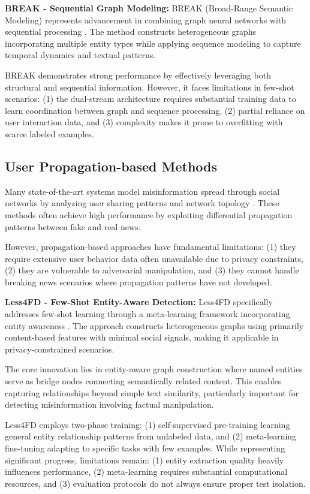 \textbf{BREAK - Sequential Graph Modeling:} BREAK (Broad-Range Semantic Modeling) represents advancement in combining graph neural networks with sequential processing \cite{ji2023break}. The method constructs heterogeneous graphs incorporating multiple entity types while applying sequence modeling to capture temporal dynamics and textual patterns.

BREAK demonstrates strong performance by effectively leveraging both structural and sequential information. However, it faces limitations in few-shot scenarios: (1) the dual-stream architecture requires substantial training data to learn coordination between graph and sequence processing, (2) partial reliance on user interaction data, and (3) complexity makes it prone to overfitting with scarce labeled examples.

\subsection{User Propagation-based Methods}

Many state-of-the-art systems model misinformation spread through social networks by analyzing user sharing patterns and network topology \cite{shu2017fake, zhou2020survey}. These methods often achieve high performance by exploiting differential propagation patterns between fake and real news.

However, propagation-based approaches have fundamental limitations: (1) they require extensive user behavior data often unavailable due to privacy constraints, (2) they are vulnerable to adversarial manipulation, and (3) they cannot handle breaking news scenarios where propagation patterns have not developed.

\textbf{Less4FD - Few-Shot Entity-Aware Detection:} Less4FD specifically addresses few-shot learning through a meta-learning framework incorporating entity awareness \cite{zhang2023less4fd}. The approach constructs heterogeneous graphs using primarily content-based features with minimal social signals, making it applicable in privacy-constrained scenarios.

The core innovation lies in entity-aware graph construction where named entities serve as bridge nodes connecting semantically related content. This enables capturing relationships beyond simple text similarity, particularly important for detecting misinformation involving factual manipulation.

Less4FD employs two-phase training: (1) self-supervised pre-training learning general entity relationship patterns from unlabeled data, and (2) meta-learning fine-tuning adapting to specific tasks with few examples. While representing significant progress, limitations remain: (1) entity extraction quality heavily influences performance, (2) meta-learning requires substantial computational resources, and (3) evaluation protocols do not always ensure proper test isolation.

